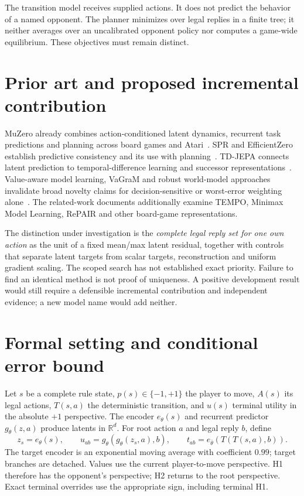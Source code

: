 \documentclass[11pt,a4paper]{article}
\begin{document}
The transition model receives supplied actions. It does not predict the
behavior of a named opponent. The planner minimizes over legal replies in a
finite tree; it neither averages over an uncalibrated opponent policy nor
computes a game-wide equilibrium. These objectives must remain distinct.

\section{Prior art and proposed incremental contribution}
MuZero already combines action-conditioned latent dynamics, recurrent task
predictions and planning across board games and Atari~\cite{muzero}.
SPR and EfficientZero establish predictive consistency and its use with
planning~\cite{spr,efficientzero}. TD-JEPA connects latent prediction to
temporal-difference learning and successor representations~\cite{tdjepa}.
Value-aware model learning, VaGraM and robust world-model approaches invalidate
broad novelty claims for decision-sensitive or worst-error weighting
alone~\cite{vagram,waker}. The related-work documents additionally examine
TEMPO, Minimax Model Learning, RePAIR and other board-game representations.

The distinction under investigation is the \emph{complete legal reply set for
one own action} as the unit of a fixed mean/max latent residual, together with
controls that separate latent targets from scalar targets, reconstruction and
uniform gradient scaling. The scoped search has not established exact priority.
Failure to find an identical method is not proof of uniqueness. A positive
development result would still require a defensible incremental contribution
and independent evidence; a new model name would add neither.

\section{Formal setting and conditional error bound}
Let $s$ be a complete rule state, $p(s)\in\{-1,+1\}$ the player to move,
$A(s)$ its legal actions, $T(s,a)$ the deterministic transition, and $u(s)$
terminal utility in the absolute $+1$ perspective. The encoder $e_\theta(s)$
and recurrent predictor $g_\theta(z,a)$ produce latents in $\mathbb R^d$.
For root action $a$ and legal reply $b$, define
\[
 z_s=e_\theta(s),\qquad
 u_{ab}=g_\theta(g_\theta(z_s,a),b),\qquad
 t_{ab}=e_{\bar\theta}(T(T(s,a),b)).
\]
The target encoder is an exponential moving average with coefficient $0.99$;
target branches are detached. Values use the current player-to-move perspective.
H1 therefore has the opponent's perspective; H2 returns to the root perspective.
Exact terminal overrides use the appropriate sign, including terminal H1.
\end{document}
